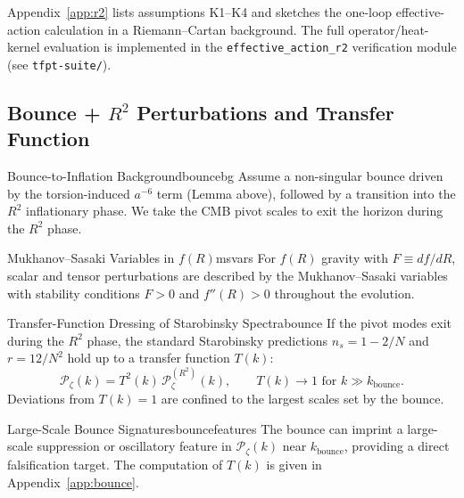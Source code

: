 \begin{tcolorbox}[colback=green!3, colframe=green!50!black, 
    title={\textbf{Derivation Provided (Conditional)}}, fonttitle=\bfseries\small]
Appendix~\ref{app:r2} lists assumptions K1--K4 and sketches the one-loop effective-action
calculation in a Riemann--Cartan background. The full operator/heat-kernel evaluation is
implemented in the \texttt{effective\_action\_r2} verification module (see \texttt{tfpt-suite/}).
\end{tcolorbox}

\subsection{Bounce + $R^2$ Perturbations and Transfer Function}
\label{sec:bounce}

\begin{definition}{Bounce-to-Inflation Background}{bouncebg}
Assume a non-singular bounce driven by the torsion-induced $a^{-6}$ term
(Lemma above), followed by a transition into the $R^2$ inflationary phase.
We take the CMB pivot scales to exit the horizon during the $R^2$ phase.
\end{definition}

\begin{definition}{Mukhanov--Sasaki Variables in $f(R)$}{msvars}
For $f(R)$ gravity with $F \equiv df/dR$, scalar and tensor perturbations are
described by the Mukhanov--Sasaki variables with stability conditions
$F>0$ and $f''(R)>0$ throughout the evolution.
\end{definition}

\begin{theorem}{Transfer-Function Dressing of Starobinsky Spectra}{bounce}
If the pivot modes exit during the $R^2$ phase, the standard Starobinsky
predictions
$n_s = 1 - 2/N$ and $r = 12/N^2$ hold up to a transfer function $T(k)$:
\begin{equation}
    \mathcal{P}_\zeta(k) = T^2(k)\,\mathcal{P}_\zeta^{(R^2)}(k),
    \qquad T(k)\to 1 \text{ for } k \gg k_{\text{bounce}}.
\end{equation}
Deviations from $T(k)=1$ are confined to the largest scales set by the bounce.
\end{theorem}

\begin{corollary}{Large-Scale Bounce Signatures}{bouncefeatures}
The bounce can imprint a large-scale suppression or oscillatory feature in
$\mathcal{P}_\zeta(k)$ near $k_{\text{bounce}}$, providing a direct falsification
target. The computation of $T(k)$ is given in Appendix~\ref{app:bounce}.
\end{corollary}

